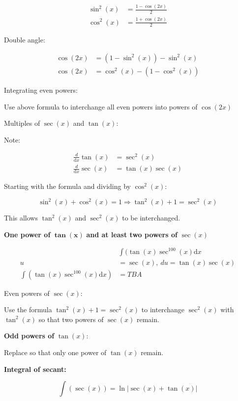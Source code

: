 \documentclass[12pt]{article}
\theoremstyle{plain}
\theoremstyle{remark}
\theoremstyle{definition}
\begin{document}
\begin{align*}
\sin^{2}(x) &= \frac{1 - \cos(2x)}{2} \\
\cos^{2}(x) &= \frac{1 + \cos(2x)}{2}
\end{align*}


Double angle:

\begin{align*}
\cos(2x) &= \left( 1 - \sin^{2}(x) \right) - \sin^{2}(x) \\
\cos(2x) &= \cos^{2}(x) - \left( 1 - \cos^{2}(x) \right)
\end{align*}


Integrating even powers:

Use above formula to interchange all even powers into powers of
\(\cos(2x)\)


Multiples of \(\sec(x)\) and \(\tan(x)\):

Note:

\begin{align*}
\frac{d}{\text{d}x}\tan(x) &= \sec^{2}(x) \\
\frac{d}{\text{d}x}\sec(x) &= \tan(x)\sec(x)
\end{align*}


Starting with the formula and dividing by \(\cos^{2}(x)\):

\[\sin^{2}(x) + \cos^{2}(x) = 1 \Rightarrow \tan^{2}(x) + 1 = \sec^{2}(x)\]

This allows \(\tan^{2}(x)\) and \(\sec^{2}(x)\) to be interchanged.

\textbf{One power of} \(\mathbf{\tan}\left( \mathbf{x} \right)\)
\textbf{and at least two powers of} \(\sec(x)\)

\begin{align*}
&\int(\tan(x)\sec^{100}{(x)\text{d}x} \\
u &= \sec(x),\ du = \tan(x)\sec(x) \\
\int\left( \tan(x)\sec^{100}(x)\text{d}x \right) &= TBA
\end{align*}


Even powers of \(\sec(x)\):

Use the formula \(\tan^{2}(x) + 1 = \sec^{2}(x)\) to interchange
\(\sec^{2}(x)\) with \(\tan^{2}(x)\) so that two powers of \(\sec(x)\)
remain.

\textbf{Odd powers of} \(\tan(x)\):

Replace so that only one power of \(\tan(x)\) remain.

\textbf{Integral of secant:}

\[\int\left( \sec(x) \right) = \ln\left| \sec(x) + \tan(x) \right|\]
\end{document}
